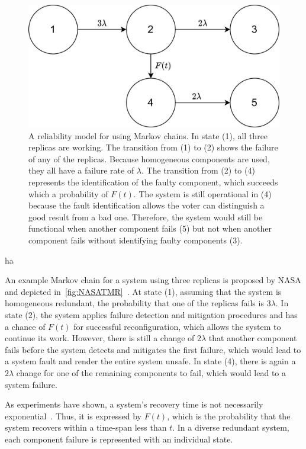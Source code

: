 \begin{figure}[!hb]
	\centering
	\includegraphics[width=0.8\linewidth]{images/TriplexSystemNASA}
	\caption{A reliability model for  using Markov chains. In state (1), all three replicas are working. The transition from (1) to (2) shows the failure of any of the replicas. Because homogeneous components are used, they all have a failure rate of $\lambda$. The transition from (2) to (4) represents the identification of the faulty component, which succeeds which a probability of $F(t)$. The system is still operational in (4) because the fault identification allows the voter can distinguish a good result from a bad one. Therefore, the system would still be functional when another component fails (5) but not when another component fails without identifying faulty components (3).}
	\label{fig:NASATMR}
\end{figure}ha 

An example Markov chain for a system using three replicas is proposed by NASA and depicted in~\autoref{fig:NASATMR}~\cite{NASAMarkovChains}.
At state (1), assuming that the system is homogeneous redundant, the probability that one of the replicas fails is $3\lambda$.
In state (2), the system applies failure detection and mitigation procedures and has a chance of $F(t)$ for successful reconfiguration, which allows the system to continue its work.
However, there is still a change of $2\lambda$ that another component fails before the system detects and mitigates the first failure, which would lead to a system fault and render the entire system unsafe.
In state (4), there is again a $2\lambda$ change for one of the remaining components to fail, which would lead to a system failure.

As experiments have shown, a system's recovery time is not necessarily exponential~\cite{TheoryAndPracticeReliableSystem}.
Thus, it is expressed by $F(t)$, which is the probability that the system recovers within a time-span less than $t$.
In a diverse redundant system, each component failure is represented with an individual state.

